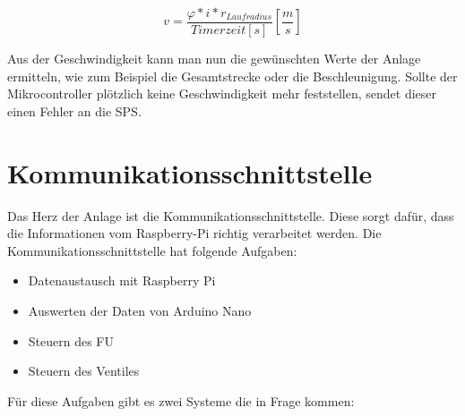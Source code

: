 \begin{center}
\begin{equation}
  \label{eq:9}
	v = \frac{\varphi * i * r_{Laufradius}}{Timerzeit [s]} [\frac{m}{s}]
\end{equation} 
\end{center}

Aus der Geschwindigkeit kann man nun die gewünschten Werte der Anlage ermitteln, wie zum Beispiel die Gesamtstrecke oder die Beschleunigung. Sollte der Mikrocontroller plötzlich keine Geschwindigkeit mehr feststellen, sendet dieser einen Fehler an die SPS.


\newpage
\section{Kommunikationsschnittstelle}
\label{sec:kommunikationsschnittstelle}

Das Herz der Anlage ist die Kommunikationsschnittstelle. Diese sorgt dafür, dass die Informationen vom Raspberry-Pi richtig verarbeitet werden. Die Kommunikationsschnittstelle hat folgende Aufgaben:

\begin{itemize}
	\item{Datenaustausch mit Raspberry Pi}
	\item{Auswerten der Daten von Arduino Nano}
	\item{Steuern des \ac{FU}}
	\item{Steuern des Ventiles}
\end{itemize}

Für diese Aufgaben gibt es zwei Systeme die in Frage kommen: 

